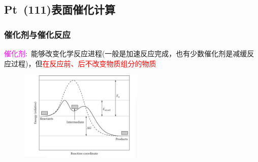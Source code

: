 \subsection{{\rm Pt~(111)}表面催化计算}
\frame
{
	\frametitle{催化剂与催化反应}
	\textcolor{magenta}{催化剂}:~能够改变化学反应进程(一般是加速反应完成，也有少数催化剂是减缓反应过程)，但\textcolor{red}{在反应前、后不改变物质组分的物质}%
\vskip 3pt
{\fontsize{7.2pt}{5.2pt}}%
\begin{figure}[h!]
\centering
\includegraphics[height=1.7in,viewport=0 0 850 660,clip]{Figures/Pt_NEB-reaction.png}
\caption{\fontsize{6.2pt}{5.2pt}\selectfont{催化剂的存在对反应通道的能量影响(反应通道)的示意图.}}%
\label{Pt_NEB-reaction}
\end{figure} 
}

